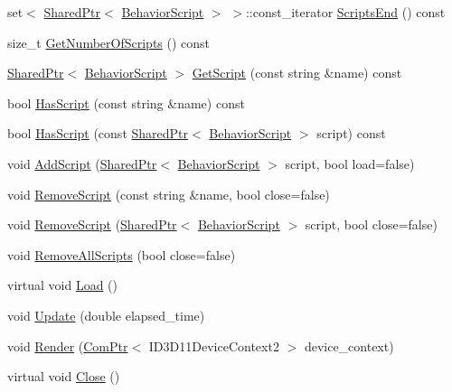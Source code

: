 \begin{DoxyCompactItemize}
\item 
set$<$ \hyperlink{namespacemage_a1e01ae66713838a7a67d30e44c67703e}{Shared\+Ptr}$<$ \hyperlink{classmage_1_1_behavior_script}{Behavior\+Script} $>$ $>$\+::const\+\_\+iterator \hyperlink{classmage_1_1_scene_ab607911e4efd677a08f54101aa8bf2fb}{Scripts\+End} () const
\item 
size\+\_\+t \hyperlink{classmage_1_1_scene_a799ac8ddd90d24f6c3c208942e4f159c}{Get\+Number\+Of\+Scripts} () const
\item 
\hyperlink{namespacemage_a1e01ae66713838a7a67d30e44c67703e}{Shared\+Ptr}$<$ \hyperlink{classmage_1_1_behavior_script}{Behavior\+Script} $>$ \hyperlink{classmage_1_1_scene_aa5d10620d1cf62ba268095f7a2cd2191}{Get\+Script} (const string \&name) const
\item 
bool \hyperlink{classmage_1_1_scene_ad87f96d612fa5087ad3ddcbb73ef05a4}{Has\+Script} (const string \&name) const
\item 
bool \hyperlink{classmage_1_1_scene_a31469e19b181d0cb08bf10c554d28a6d}{Has\+Script} (const \hyperlink{namespacemage_a1e01ae66713838a7a67d30e44c67703e}{Shared\+Ptr}$<$ \hyperlink{classmage_1_1_behavior_script}{Behavior\+Script} $>$ script) const
\item 
void \hyperlink{classmage_1_1_scene_aa98dbf063994948dd2e434c7f0f6ee06}{Add\+Script} (\hyperlink{namespacemage_a1e01ae66713838a7a67d30e44c67703e}{Shared\+Ptr}$<$ \hyperlink{classmage_1_1_behavior_script}{Behavior\+Script} $>$ script, bool load=false)
\item 
void \hyperlink{classmage_1_1_scene_ad240957fb1b30254878cda8e20d7f7f4}{Remove\+Script} (const string \&name, bool close=false)
\item 
void \hyperlink{classmage_1_1_scene_a90808e9356fae9b156a6e23c03950f77}{Remove\+Script} (\hyperlink{namespacemage_a1e01ae66713838a7a67d30e44c67703e}{Shared\+Ptr}$<$ \hyperlink{classmage_1_1_behavior_script}{Behavior\+Script} $>$ script, bool close=false)
\item 
void \hyperlink{classmage_1_1_scene_a283b7623f1f91e5b7ea53c3c938d6026}{Remove\+All\+Scripts} (bool close=false)
\item 
virtual void \hyperlink{classmage_1_1_scene_a472443b059c8be0fcd223f6df8378934}{Load} ()
\item 
void \hyperlink{classmage_1_1_scene_a8751628bf9ed4f15993ca4e8e2ffc966}{Update} (double elapsed\+\_\+time)
\item 
void \hyperlink{classmage_1_1_scene_ada79dabc862e6bb873400ecbe774f5f7}{Render} (\hyperlink{namespacemage_ae74f374780900893caa5555d1031fd79}{Com\+Ptr}$<$ I\+D3\+D11\+Device\+Context2 $>$ device\+\_\+context)
\item 
virtual void \hyperlink{classmage_1_1_scene_afcdedaac5ecab7dcbbb180426054aaa5}{Close} ()
\end{DoxyCompactItemize}
